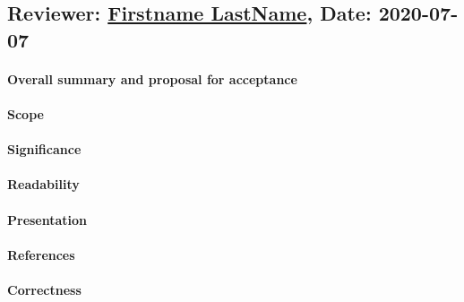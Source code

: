 \documentclass{jhps}
\begin{document}
\reviews   %

\subsection*{Reviewer: \href{Optional URL to reviewer page}{Firstname LastName}, Date: 2020-07-07}

\paragraph{Overall summary and proposal for acceptance}

\paragraph{Scope}   %

\paragraph{Significance}   %

\paragraph{Readability}   %

\paragraph{Presentation}

\paragraph{References}   %

\paragraph{Correctness}   %
\end{document}

